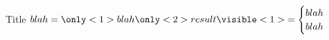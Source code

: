 \documentclass{beamer}
\begin{document}
\begin{frame}{Title}
  $
    blah =
    \only<1>{blah}
    \only<2>{result}
    \visible<1>{%
      =
      \begin{cases}
          blah \\ 
          blah
        \end{cases}
      }
    $
\end{frame}
\end{document}
